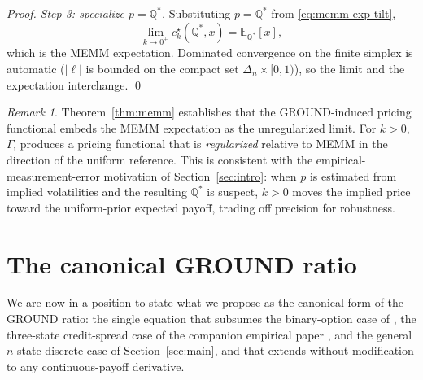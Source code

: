 \documentclass[11pt]{article}
\theoremstyle{definition}
\theoremstyle{remark}
\newtheorem{remark}[theorem]{Remark}
\newcommand{\E}{\mathbb{E}}
\newcommand{\Q}{\mathbb{Q}}
\newcommand{\GROUND}{\Gamma_{\mathrm{i}}}
\begin{document}
\begin{proof}
\emph{Step 3: specialize $p = \Q^*$.} Substituting $p = \Q^*$ from
\eqref{eq:memm-exp-tilt},
\begin{equation*}
\lim_{k \to 0^+} c^\star_k(\Q^*, x) = \E_{\Q^*}[x],
\end{equation*}
which is the MEMM expectation. Dominated convergence on the finite
simplex is automatic ($|\ell|$ is bounded on the compact set $\Delta_n
\times [0, 1)$), so the limit and the expectation interchange. \qed
\end{proof}

\begin{remark}
Theorem~\ref{thm:memm} establishes that the GROUND-induced pricing
functional embeds the MEMM expectation as the unregularized limit. For
$k > 0$, $\GROUND$ produces a pricing functional that is
\emph{regularized} relative to MEMM in the direction of the uniform
reference. This is consistent with the empirical-measurement-error
motivation of Section~\ref{sec:intro}: when $p$ is estimated from
implied volatilities and the resulting $\Q^*$ is suspect, $k > 0$
moves the implied price toward the uniform-prior expected payoff,
trading off precision for robustness.
\end{remark}
\section{The canonical GROUND ratio}\label{sec:continuous}

We are now in a position to state what we propose as the canonical
form of the GROUND ratio: the single equation that subsumes the
binary-option case of \citet{mercurio2020binary}, the three-state
credit-spread case of the companion empirical paper
\citep{mercurio2026empirical}, and the general $n$-state discrete
case of Section~\ref{sec:main}, and that extends without modification
to any continuous-payoff derivative.
\end{document}
